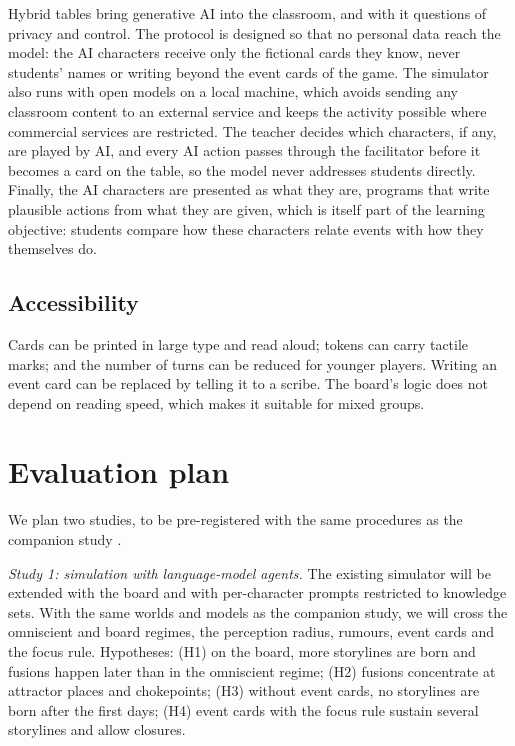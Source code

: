 \documentclass[12pt]{article}
\begin{document}
Hybrid tables bring generative AI into the classroom, and with it questions
of privacy and control. The protocol is designed so that no personal data
reach the model: the AI characters receive only the fictional cards they
know, never students' names or writing beyond the event cards of the game.
The simulator also runs with open models on a local machine, which avoids
sending any classroom content to an external service and keeps the activity
possible where commercial services are restricted. The teacher decides which
characters, if any, are played by AI, and every AI action passes through the
facilitator before it becomes a card on the table, so the model never
addresses students directly. Finally, the AI characters are presented as what
they are, programs that write plausible actions from what they are given,
which is itself part of the learning objective: students compare how these
characters relate events with how they themselves do.

\subsection{Accessibility}

Cards can be printed in large type and read aloud; tokens can carry tactile
marks; and the number of turns can be reduced for younger players. Writing an
event card can be replaced by telling it to a scribe. The board's logic
does not depend on reading speed, which makes it suitable for mixed groups.

\section{Evaluation plan}

We plan two studies, to be pre-registered with the same procedures as the
companion study \parencite{nosek2018}.

\emph{Study 1: simulation with language-model agents.} The existing simulator
will be extended with the board and with per-character prompts restricted to
knowledge sets. With the same worlds and models as the companion study, we
will cross the omniscient and board regimes, the perception radius, rumours,
event cards and the focus rule. Hypotheses: (H1) on the board, more
storylines are born and fusions happen later than in the omniscient regime;
(H2) fusions concentrate at attractor places and chokepoints; (H3) without
event cards, no storylines are born after the first days; (H4) event cards
with the focus rule sustain several storylines and allow closures.
\end{document}
